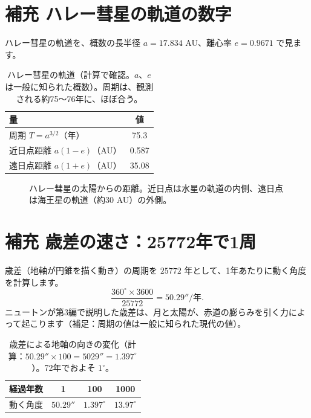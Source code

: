 \documentclass[a4paper,11pt,openany]{ltjsbook}
\begin{document}
\section{補充 ハレー彗星の軌道の数字}

ハレー彗星の軌道を、概数の長半径 $a=17.834$ AU、離心率 $e=0.9671$ で見ます。

\begin{table}[htbp]
\centering
\begin{tabular}{lc}
\toprule
量 & 値\\
\midrule
周期 $T=a^{3/2}$（年） & 75.3\\
近日点距離 $a(1-e)$（AU） & 0.587\\
遠日点距離 $a(1+e)$（AU） & 35.08\\
\bottomrule
\end{tabular}
\caption{ハレー彗星の軌道（計算で確認。$a$、$e$ は一般に知られた概数）。周期は、観測される約75〜76年に、ほぼ合う。}
\end{table}

\begin{figure}[htbp]
\centering
{}
\caption{ハレー彗星の太陽からの距離。近日点は水星の軌道の内側、遠日点は海王星の軌道（約30 AU）の外側。}
\end{figure}

\section{補充 歳差の速さ：25772年で1周}

歳差（地軸が円錐を描く動き）の周期を $25772$ 年として、1年あたりに動く角度を計算します。
\[
\frac{360^\circ\times3600}{25772}=50.29''/\text{年}.
\]
ニュートンが第3編で説明した歳差は、月と太陽が、赤道の膨らみを引く力によって起こります（補足：周期の値は一般に知られた現代の値）。

\begin{table}[htbp]
\centering
\begin{tabular}{c|ccc}
\toprule
経過年数 & 1 & 100 & 1000\\
\midrule
動く角度 & $50.29''$ & $1.397^\circ$ & $13.97^\circ$\\
\bottomrule
\end{tabular}
\caption{歳差による地軸の向きの変化（計算：$50.29''\times100=5029''=1.397^\circ$）。72年でおよそ $1^\circ$。}
\end{table}
\end{document}
